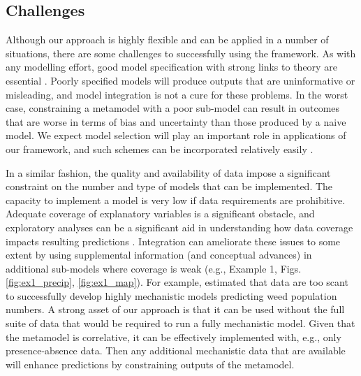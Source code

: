 

\subsection*{Challenges} 
Although our approach is highly flexible and can be applied in a number of situations, there are some challenges to successfully using the framework.
As with any modelling effort, good model specification with strong links to theory are essential \citep{Austin2007}.
Poorly specified models will produce outputs that are uninformative or misleading, and model integration is not a cure for these problems.
In the worst case, constraining a metamodel with a poor sub-model can result in outcomes that are worse in terms of bias and uncertainty than those produced by a naive model.
We expect model selection will play an important role in applications of our framework, and such schemes can be incorporated relatively easily \citep{Madigan1995, Wasserman2000, Tenan2014}.

In a similar fashion, the quality and availability of data impose a significant constraint on the number and type of models that can be implemented.
The capacity to implement a model is very low if data requirements are prohibitive. 
Adequate coverage of explanatory variables is a significant obstacle, and exploratory analyses can be a significant aid in understanding how data coverage impacts resulting predictions \citep{Mckenney2002}.
Integration can ameliorate these issues to some extent by using supplemental information (and conceptual advances) in additional sub-models where coverage is weak (e.g., Example 1, Figs. \ref{fig:ex1_precip}, \ref{fig:ex1_map}).
For example, \citet{Freckleton2009} estimated that data are too scant to successfully develop highly mechanistic models predicting weed population numbers. 
A strong asset of our approach is that it can be used without the full suite of data that would be required to run a fully mechanistic model. 
Given that the metamodel is correlative, it can be effectively implemented with, e.g., only presence-absence data. 
Then any additional mechanistic data that are available will enhance predictions by constraining outputs of the metamodel. 

